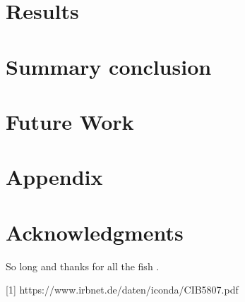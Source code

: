 \documentclass[fleqn,10pt]{SelfArx} %
\begin{document}
\section{Results}
\section{Summary conclusion}
\section{Future Work}
\section{Appendix}
\section*{Acknowledgments} %


So long and thanks for all the fish \cite{Figueredo:2009dg}.



[1] https://www.irbnet.de/daten/iconda/CIB5807.pdf
\end{document}
